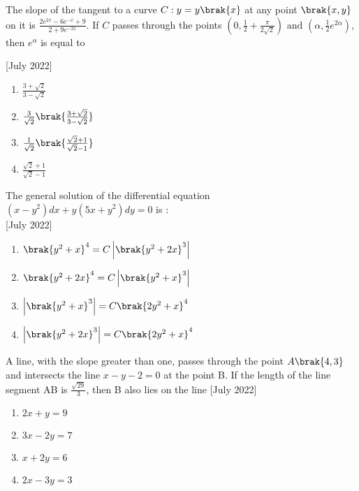     \item{
	           The slope of the tangent to a curve $C : y = y\brak{x}$ at any point $\brak{x, y}$ on it is $\frac{2e^{2x}-6e^{-x}+9}{2+9e^{-2x}}$. If $C$ passes through the points $\left(0, \frac{1}{2}+\frac{\pi}{2\sqrt{2}}\right)\text{ and }\left(\alpha,\frac{1}{2}e^{2\alpha}\right),$ then $ e^\alpha $ is equal to 
            
             \hfill
                {[July 2022]}
            \begin{multicols}{2}
                \begin{enumerate}
                	\item $\frac{3+\sqrt{2}}{3-\sqrt{2}}$
                	\item $\frac{3}{\sqrt{2}}\brak{\frac{3+\sqrt{2}}{3-\sqrt{2}}}$
                	\item $\frac{1}{\sqrt{2}}\brak{\frac{\sqrt{2}+1}{\sqrt{2}-1}}$
                	\item $\frac{\sqrt{2}+1}{\sqrt{2}-1}$
                \end{enumerate}
            \end{multicols}
        
        }
    \item{
    		The general solution of the differential equation $(x - y^2)dx + y(5x + y^2)dy = 0$ is :\\ \text{ }
             \hfill
                {[July 2022]}
			\begin{multicols}{2}
				\begin{enumerate}
					\item $\brak{y^2+x}^4=C\left|\brak{y^2+2x}^3\right|$
					\item $\brak{y^2+2x}^4=C\left|\brak{y^2+x}^3\right|$
					\item $\left|\brak{y^2+x}^3\right|=C\brak{2y^2+x}^4$
					\item $\left|\brak{y^2+2x}^3\right|=C\brak{2y^2+x}^4$
				\end{enumerate}
			\end{multicols}
        
        }
    \item{
        	A line, with the slope greater than one, passes through the point $A\brak{4, 3}$ and intersects the line $x - y - 2 = 0$ at the point B. If the length of the line segment AB is $\frac{\sqrt{29}}{3}$, then B also lies on the line\hfill
                {[July 2022]}
				\begin{multicols}{4}
	                \begin{enumerate}
	                	\item $2x + y = 9$
	                	\item $3x - 2y = 7$
	                	\item $x + 2y = 6$
	                	\item $2x - 3y = 3$
	                \end{enumerate}
				\end{multicols}
        
        }
